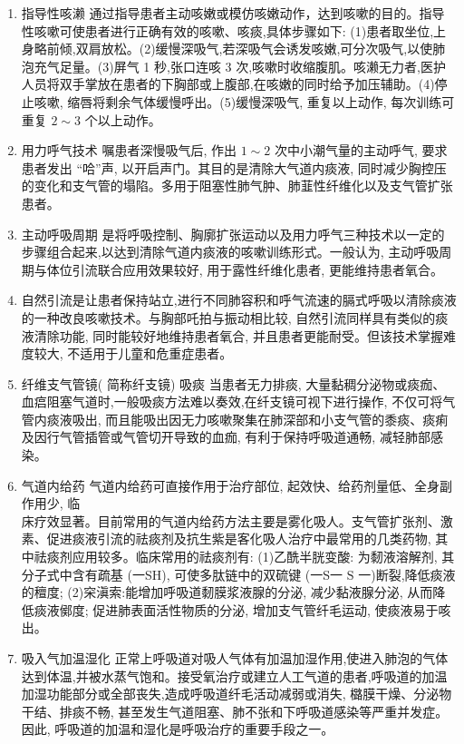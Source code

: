 \documentclass[10pt]{article}
\begin{document}
\begin{enumerate}
  \item 指导性咳濑 通过指导患者主动咳嫩或模仿咳嫩动作，达到咳嗽的目的。指导性咳嗽可使患者进行正确有效的咳嗽、咳痰,具体步骤如下: (1)患者取坐位,上身略前倾,双肩放松。(2)缓慢深吸气,若深吸气会诱发咳嫩,可分次吸气,以使肺泡充气足量。(3)屏气 1 秒,张口连咳 3 次,咳嗽时收缩腹肌。咳濑无力者,医护人员将双手掌放在患者的下胸部或上腹部,在咳嫩的同时给予加压辅助。(4)停止咳嗽, 缩唇将剩余气体缓慢呼出。(5)缓慢深吸气, 重复以上动作, 每次训练可重复 $2 \sim 3$ 个以上动作。

  \item 用力呼气技术 嘱患者深慢吸气后, 作出 $1 \sim 2$ 次中小潮气量的主动呼气, 要求患者发出 “哈”声, 以开启声门。其目的是清除大气道内痰液, 同时减少胸控压的变化和支气管的塌陷。多用于阻塞性肺气肿、肺韮性纤维化以及支气管扩张患者。

  \item 主动呼吸周期 是将呼吸控制、胸廓扩张运动以及用力呼气三种技术以一定的步骤组合起来,以达到清除气道内痰液的咳嗽训练形式。一般认为, 主动呼吸周期与体位引流联合应用效果较好, 用于露性纤维化患者, 更能维持患者氧合。

  \item 自然引流是让患者保持站立,进行不同肺容积和呼气流速的膈式呼吸以清除痰液的一种改良咳嗽技术。与胸部吒拍与振动相比较, 自然引流同样具有类似的痰液清除功能, 同时能较好地维持患者氧合, 并且患者更能耐受。但该技术掌握难度较大, 不适用于儿童和危重症患者。

  \item 纤维支气管镜( 简称纤支镜) 吸痰 当患者无力排痰, 大量黏稠分泌物或痰痂、血㾔阻塞气道时,一般吸痰方法难以奏效,在纤支镜可视下进行操作, 不仅可将气管内痰液吸出, 而且能吸出因无力咳嗽聚集在肺深部和小支气管的黍痰、痰痢及因行气管插管或气管切开导致的血痂, 有利于保持呼吸道通畅, 减轻肺部感染。

  \item 气道内给药 气道内给药可直接作用于治疗部位, 起效快、给药剂量低、全身副作用少, 临\\
床疗效显著。目前常用的气道内给药方法主要是雾化吸人。支气管扩张剂、激素、促进痰液引流的祛痰剂及抗生紫是客化吸人治疗中最常用的几类药物, 其中祛痰剂应用较多。临床常用的祛痰剂有: (1)乙酰半胱变酸: 为䵑液溶解剂, 其分子式中含有疏基 (一SH), 可使多肽链中的双硫键 (一S一 $\mathrm{S}$ 一)断裂,降低痰液的䆄度; (2)穼滇索:能增加呼吸道䵑膜浆液腺的分泌, 减少黏液腺分泌, 从而降低痰液鄇度; 促进肺表面活性物质的分泌, 增加支气管纤毛运动, 使痰液易于咳出。

  \item 吸入气加温湿化 正常上呼吸道对吸人气体有加温加湿作用,使进入肺泡的气体达到体温,并被水蒸气饱和。接受氧治疗或建立人工气道的患者,呼吸道的加温加湿功能部分或全部丧失,造成呼吸道纤毛活动减弱或消失, 㯝膜干燥、分泌物干结、排痰不畅, 甚至发生气道阻塞、肺不张和下呼吸道感染等严重并发症。因此, 呼吸道的加温和湿化是呼吸治疗的重要手段之一。

\end{enumerate}
\end{document}
